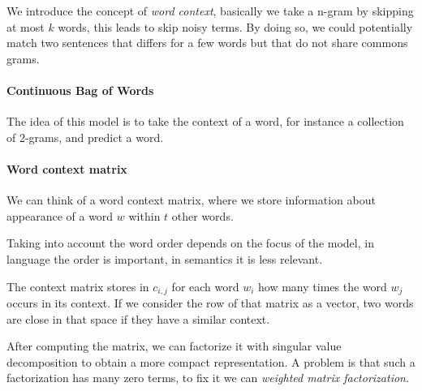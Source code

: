 We introduce the concept of \emph{word context}, 
basically we take a n-gram by skipping at most $k$ words, 
this leads to skip noisy terms.
By doing so, we could potentially match two sentences 
that differs for a few words but that do not share commons 
grams.

\paragraph{Continuous Bag of Words}
The idea of this model is to take the context of a word, 
for instance a collection of 2-grams, and predict a word.

\paragraph{Word context matrix}
We can think of a word context matrix, where we 
store information about appearance of a word $w$ 
within $t$ other words.

Taking into account the word order depends on the focus of
the model, in language the order is important, in semantics
it is less relevant.

The context matrix stores in $c_{i, j}$ for each word $w_i$
how many times the word $w_j$ occurs in its context. 
If we consider the row of that matrix as a vector, two words 
are close in that space if they have a similar context.

After computing the matrix, we can factorize it with singular value 
decomposition to obtain a more compact representation.
A problem is that such a factorization has many zero terms, to 
fix it we can \emph{weighted matrix factorization}.